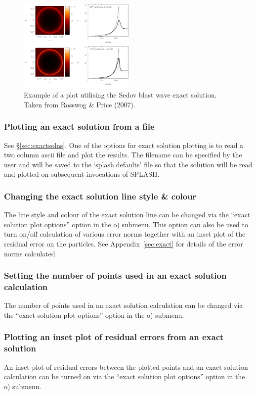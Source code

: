 \documentclass[a4paper,11pt]{article}
\begin{document}
\begin{figure}[h]
\begin{center}
\includegraphics[width=0.5\textwidth]{sedov_example.png}
\caption{Example of a plot utilising the Sedov blast wave exact solution. Taken from Rosswog \& Price (2007).}
\label{fig:sedov}
\end{center}
\end{figure}


\subsubsection{ Plotting an exact solution from a file}
 See \S\ref{sec:exactsolns}. One of the options for exact solution plotting is to read a two column ascii file and plot the results. The filename can be specified by the user and will be saved to the `splash.defaults' file so that the solution will be read and plotted on subsequent invocations of SPLASH.

\subsubsection{ Changing the exact solution line style \& colour}
 The line style and colour of the exact solution line can be changed via the ``exact solution plot options'' option in the o) submenu. This option can also be used to turn on/off calculation of various error norms
together with an inset plot of the residual error on the particles. See
Appendix~\ref{sec:exact} for details of the error norms calculated.

\subsubsection{ Setting the number of points used in an exact solution calculation}
The number of points used in an exact solution calculation can be changed via the ``exact solution plot options'' option in the o) submenu.

\subsubsection{ Plotting an inset plot of residual errors from an exact solution}
 An inset plot of residual errors between the plotted points and an exact solution calculation can be turned on via the ``exact solution plot options'' option in the o) submenu.
\end{document}
